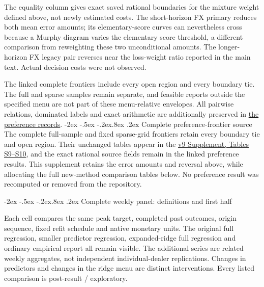 \documentclass[10pt,a4paper]{article}
\makeatletter
\renewcommand\section{\@startsection{section}{1}{\z@}%
  {-2ex \@plus -.5ex \@minus -.2ex}{.8ex \@plus .2ex}%
  {\normalfont\large\bfseries}}
\makeatother
\begin{document}
The equality column gives exact saved rational boundaries for the mixture
weight defined above, not newly estimated costs. The short-horizon FX primary reduces both mean error amounts;
its elementary-score curves can nevertheless cross because a Murphy diagram
varies the elementary score threshold, a different comparison from reweighting
these two unconditional amounts. The longer-horizon FX legacy pair reverses
near the loss-weight ratio reported in the main text. Actual decision costs
were not observed.

The linked complete frontiers include every open region and every boundary tie.
The full and sparse samples remain separate, and feasible reports outside the
specified menu are not part of these menu-relative envelopes. All pairwise
relations, dominated labels and exact arithmetic are additionally preserved in
\href{https://github.com/ByronLi0207/financial-mathematics-paper-20261020/blob/revision-v7-final/results/revision-20261022/preference-robustness/README.md}{the preference records}.\section{Complete preference-frontier source}\label{sup:frontier-0}\label{sup:frontier-8}
The complete full-sample and fixed sparse-grid frontiers retain every boundary tie and open region. Their unchanged tables appear in the \href{https://github.com/ByronLi0207/financial-mathematics-paper-20261020/blob/0d2526cc69092c5158437a0509613bac5e86d47f/submission-jof/supplement.pdf}{v9 Supplement, Tables S9--S10}, and the exact rational source fields remain in the linked preference results. This supplement retains the error amounts and reversal above, while allocating the full new-method comparison tables below. No preference result was recomputed or removed from the repository.

\section{Complete weekly panel: definitions and first half}\label{sup:panel}

Each cell compares the same peak target, completed past outcomes,
origin sequence, fixed refit schedule and native monetary units. The original
full regression, smaller predictor regression, expanded-ridge full regression
and ordinary empirical report all remain visible. The additional series are
related weekly aggregates, not independent individual-dealer replications.
Changes in predictors and changes in the ridge menu are distinct interventions.
Every listed comparison is post-result / exploratory.
\end{document}
